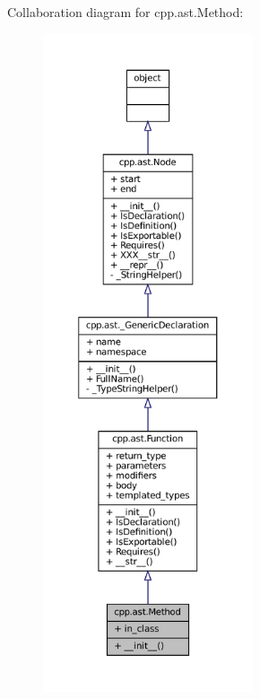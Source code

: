 Collaboration diagram for cpp.\+ast.\+Method\+:
\nopagebreak
\begin{figure}[H]
\begin{center}
\leavevmode
\includegraphics[height=550pt]{classcpp_1_1ast_1_1Method__coll__graph}
\end{center}
\end{figure}
